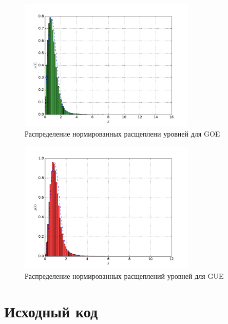 \documentclass[a4paper]{article}
\begin{document}
\begin{figure}[H]
	\center
	\includegraphics[width=0.75\textwidth]{../pictures/lab4_goe_spacing_hist.pdf}
	\caption{Распределение нормированных расщеплени уровней для GOE}
	\label{fig:goe_spacing}
\end{figure}

\begin{figure}[H]
	\center
	\includegraphics[width=0.75\textwidth]{../pictures/lab4_gue_spacing_hist.pdf}
	\caption{Распределение нормированных расщеплений уровней для GUE}
	\label{fig:gue_spacing}
\end{figure}


\section{Исходный код}

\end{document}
